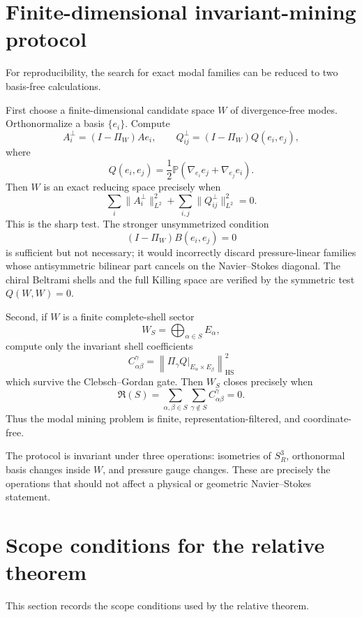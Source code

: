 \documentclass[aps,prd,reprint,superscriptaddress,nofootinbib,floatfix]{revtex4-2}
\theoremstyle{definition}
\theoremstyle{remark}
\newcommand{\PP}{\mathbb{P}}
\begin{document}
\section{Finite-dimensional invariant-mining protocol}
\label{app:invariant-mining}

For reproducibility, the search for exact modal families can be reduced to two basis-free calculations.

First choose a finite-dimensional candidate space \(W\) of divergence-free modes.  Orthonormalize a basis \(\{e_i\}\).  Compute
\[
	A_i^\perp=(I-\Pi_W)Ae_i,\qquad
	Q_{ij}^\perp=(I-\Pi_W)Q(e_i,e_j),
\]
where
\[
	Q(e_i,e_j)=\frac12\PP(\nabla_{e_i}e_j+\nabla_{e_j}e_i).
\]
Then \(W\) is an exact reducing space precisely when
\[
	\sum_i\|A_i^\perp\|_{L^2}^2+
	\sum_{i,j}\|Q_{ij}^\perp\|_{L^2}^2=0.
\]
This is the sharp test.  The stronger unsymmetrized condition
\[
	(I-\Pi_W)B(e_i,e_j)=0
\]
is sufficient but not necessary; it would incorrectly discard pressure-linear families whose antisymmetric bilinear part cancels on the Navier--Stokes diagonal.  The chiral Beltrami shells and the full Killing space are verified by the symmetric test \(Q(W,W)=0\).

Second, if \(W\) is a finite complete-shell sector
\[
	W_S=\bigoplus_{\alpha\in S}E_\alpha,
\]
compute only the invariant shell coefficients
\[
	C_{\alpha\beta}^{\gamma}
	=
	\left\|\Pi_\gamma Q\big|_{E_\alpha\times E_\beta}\right\|_{\mathrm{HS}}^2
\]
which survive the Clebsch--Gordan gate.  Then \(W_S\) closes precisely when
\[
	\mathfrak R(S)=
	\sum_{\alpha,\beta\in S}\sum_{\gamma\notin S}C_{\alpha\beta}^{\gamma}=0.
\]
Thus the modal mining problem is finite, representation-filtered, and coordinate-free.

The protocol is invariant under three operations: isometries of \(S^3_R\), orthonormal basis changes inside \(W\), and pressure gauge changes.  These are precisely the operations that should not affect a physical or geometric Navier--Stokes statement.

\section{Scope conditions for the relative theorem}\label{sec:scopeconditions}

This section records the scope conditions used by the relative theorem.
\end{document}
